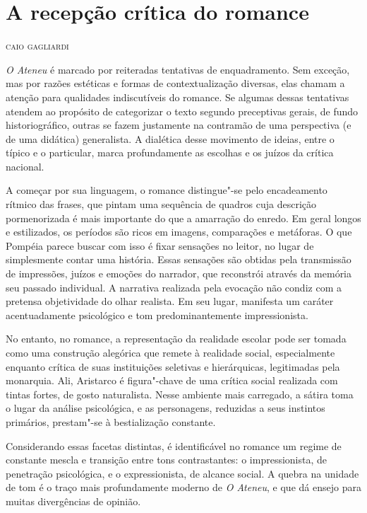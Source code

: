 \chapter[Posfácio]{A recepção crítica do romance}


\begin{flushright}
\textsc{caio gagliardi}
\end{flushright}

\textit{O Ateneu} é marcado por reiteradas
tentativas de enquadramento. Sem exceção, mas por razões estéticas e
formas de contextualização diversas, elas chamam a atenção para
qualidades indiscutíveis do romance. Se algumas dessas tentativas
atendem ao propósito de categorizar o texto segundo preceptivas gerais,
de fundo historiográfico, outras se fazem justamente na contramão de
uma perspectiva (e de uma didática) generalista. A dialética desse
movimento de ideias, entre o típico e o particular, marca profundamente
as escolhas e os juízos da crítica nacional. 

A começar por sua linguagem, o romance distingue"-se pelo encadeamento
rítmico das frases, que pintam uma sequência de quadros cuja descrição
pormenorizada é mais importante do que a amarração do enredo. Em geral
longos e estilizados, os períodos são ricos em imagens, comparações e
metáforas. O que Pompéia parece buscar com isso é fixar sensações no
leitor, no lugar de simplesmente contar uma história. Essas sensações
são obtidas pela transmissão de impressões, juízos e emoções do
narrador, que reconstrói através da memória seu passado individual. A
narrativa realizada pela evocação não condiz com a pretensa
objetividade do olhar realista. Em seu lugar, manifesta um caráter
acentuadamente psicológico e tom predominantemente impressionista.

No entanto, no romance, a representação da realidade escolar pode ser
tomada como uma construção alegórica que remete à realidade social,
especialmente enquanto crítica de suas instituições seletivas e
hierárquicas, legitimadas pela monarquia. Ali, Aristarco é
figura"-chave de uma crítica social realizada com tintas fortes, de
gosto naturalista. Nesse ambiente mais carregado, a sátira toma o lugar
da análise psicológica, e as personagens, reduzidas a seus instintos
primários, prestam"-se à bestialização constante.

Considerando essas facetas distintas, é identificável no
romance um regime de constante mescla e transição entre tons
contrastantes: o impressionista, de penetração psicológica, e o
expressionista, de alcance social. A quebra na unidade de tom é o traço
mais profundamente moderno de \textit{O Ateneu}, 
e que dá ensejo para muitas divergências de opinião.  


